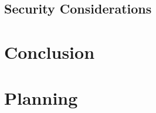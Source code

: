 \documentclass[numbers=noenddot, abstract=on, a4paper, headsepline,
footsepline, oneside, draft=off]{scrreprt}
\begin{document}
\section{Security Considerations}
\label{sec:securityconsiderations}

\chapter{Conclusion}
\label{cha:conclusion}

\printbibliography

\appendix

\chapter{Planning}
\end{document}
